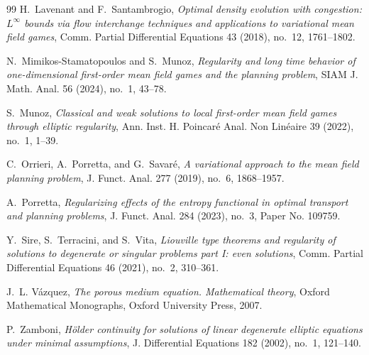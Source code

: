 \documentclass[11pt]{amsart}
\begin{document}
\begin{thebibliography}{99}
H.~Lavenant and F.~Santambrogio,
\emph{Optimal density evolution with congestion: \(L^\infty\) bounds via flow
interchange techniques and applications to variational mean field games},
Comm. Partial Differential Equations 43 (2018), no.~12, 1761--1802.

N.~Mimikos-Stamatopoulos and S.~Munoz,
\emph{Regularity and long time behavior of one-dimensional first-order mean
field games and the planning problem},
SIAM J. Math. Anal. 56 (2024), no.~1, 43--78.

S.~Munoz,
\emph{Classical and weak solutions to local first-order mean field games
through elliptic regularity},
Ann. Inst. H. Poincar\'e Anal. Non Lin\'eaire 39 (2022), no.~1, 1--39.

C.~Orrieri, A.~Porretta, and G.~Savar\'e,
\emph{A variational approach to the mean field planning problem},
J. Funct. Anal. 277 (2019), no.~6, 1868--1957.

A.~Porretta,
\emph{Regularizing effects of the entropy functional in optimal transport and
planning problems},
J. Funct. Anal. 284 (2023), no.~3, Paper No. 109759.

Y.~Sire, S.~Terracini, and S.~Vita,
\emph{Liouville type theorems and regularity of solutions to degenerate or
singular problems part I: even solutions},
Comm. Partial Differential Equations 46 (2021), no.~2, 310--361.

J.~L. V\'azquez,
\emph{The porous medium equation. Mathematical theory},
Oxford Mathematical Monographs, Oxford University Press, 2007.

P.~Zamboni,
\emph{H\"older continuity for solutions of linear degenerate elliptic equations
under minimal assumptions},
J. Differential Equations 182 (2002), no.~1, 121--140.

\end{thebibliography}
\end{document}
